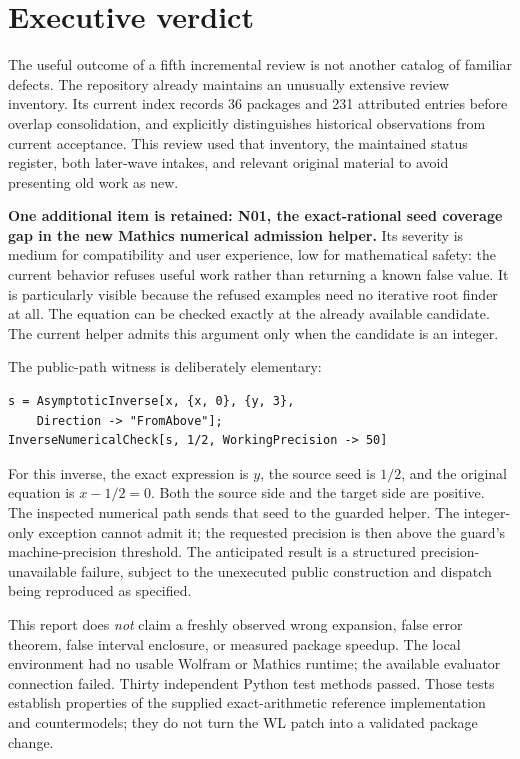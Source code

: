 \documentclass[11pt,letterpaper]{article}
\begin{document}
\section{Executive verdict}

The useful outcome of a fifth incremental review is not another catalog of familiar defects. The repository already maintains an unusually extensive review inventory. Its current index records 36 packages and 231 attributed entries before overlap consolidation, and explicitly distinguishes historical observations from current acceptance. This review used that inventory, the maintained status register, both later-wave intakes, and relevant original material to avoid presenting old work as new.\cite{review-index,status,wave3,wave4}

\textbf{One additional item is retained: N01, the exact-rational seed coverage gap in the new Mathics numerical admission helper.} Its severity is medium for compatibility and user experience, low for mathematical safety: the current behavior refuses useful work rather than returning a known false value. It is particularly visible because the refused examples need no iterative root finder at all. The equation can be checked exactly at the already available candidate. The current helper admits this argument only when the candidate is an integer.\cite{mathics-numeric}

The public-path witness is deliberately elementary:
\begin{lstlisting}
s = AsymptoticInverse[x, {x, 0}, {y, 3},
    Direction -> "FromAbove"];
InverseNumericalCheck[s, 1/2, WorkingPrecision -> 50]
\end{lstlisting}
For this inverse, the exact expression is $y$, the source seed is $1/2$, and the original equation is $x-1/2=0$. Both the source side and the target side are positive. The inspected numerical path sends that seed to the guarded helper. The integer-only exception cannot admit it; the requested precision is then above the guard's machine-precision threshold. The anticipated result is a structured precision-unavailable failure, subject to the unexecuted public construction and dispatch being reproduced as specified.\cite{core,numerical-checks,mathics-numeric}

This report does \emph{not} claim a freshly observed wrong expansion, false error theorem, false interval enclosure, or measured package speedup. The local environment had no usable Wolfram or Mathics runtime; the available evaluator connection failed. Thirty independent Python test methods passed. Those tests establish properties of the supplied exact-arithmetic reference implementation and countermodels; they do not turn the WL patch into a validated package change.
\end{document}
